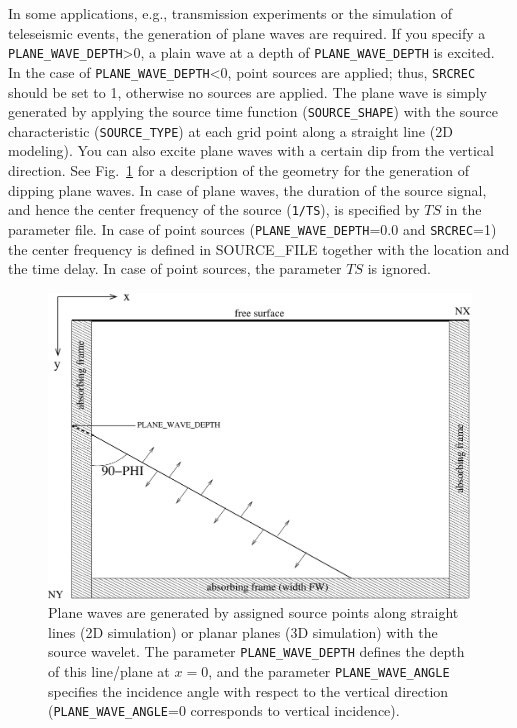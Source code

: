 In some applications, e.g., transmission experiments or the simulation of teleseismic events, the generation of plane waves are required. If you specify a \texttt{PLANE\_WAVE\_DEPTH}>0, a plain wave at a depth of \texttt{PLANE\_WAVE\_DEPTH} is excited. In the case of \texttt{PLANE\_WAVE\_DEPTH}<0, point sources are applied; thus, \texttt{SRCREC} should be set to 1, otherwise no sources are applied. The plane wave is simply generated by applying the source time function (\texttt{SOURCE\_SHAPE}) with the source characteristic (\texttt{SOURCE\_TYPE}) at each grid point along a straight line (2D modeling). You can also excite plane waves with a certain dip from the vertical direction. See Fig.~\ref{fig_plane_wave} for a description of the geometry for the generation of dipping plane waves. In case of plane waves, the duration of the source signal, and hence the center frequency of the source (\texttt{1/TS}), is specified by $TS$ in the parameter file. In case of point sources (\texttt{PLANE\_WAVE\_DEPTH}=0.0 and \texttt{SRCREC}=1) the center frequency is defined in SOURCE\_FILE together with the location and the time delay. In case of point sources, the parameter $TS$ is ignored.
\begin{figure}[ht!]
\centering
    \includegraphics[width=12cm,angle=0]{figures/plane_wave.pdf}
    \caption{Plane waves are generated by assigned source points along  straight lines (2D simulation) or planar planes (3D simulation) with the source wavelet. The parameter \texttt{PLANE\_WAVE\_DEPTH} defines the depth of this line/plane at $x=0$, and the parameter \texttt{PLANE\_WAVE\_ANGLE} specifies the incidence angle with respect to the vertical direction (\texttt{PLANE\_WAVE\_ANGLE}=0 corresponds to vertical incidence).}
    \label{fig_plane_wave}
\end{figure}

